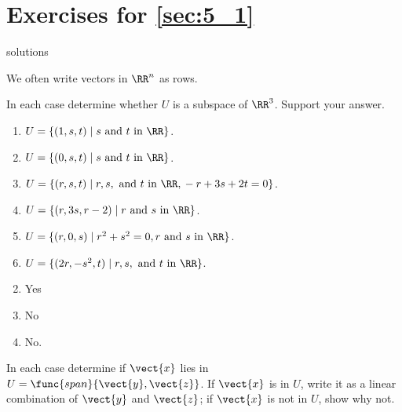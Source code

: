 \section*{Exercises for \ref{sec:5_1}}

\begin{Filesave}{solutions}
\end{Filesave}

\begin{multicols}{2}
{\small \noindent We often write vectors in $\RR^n$ as rows.}

\begin{ex}
In each case determine whether $U$ is a subspace of $\RR^3$. Support your answer.

\begin{enumerate}[label={\alph*.}]
\item $U = \{(1, s, t) \mid s \mbox{ and }t \mbox{ in }\RR\}$.

\item $U = \{(0, s, t) \mid s \mbox{ and } t \mbox{ in } \RR\}$.

\item $U = \{(r, s, t) \mid r, s,\mbox{ and } t \mbox{ in } \RR, \\
 -r + 3s + 2t = 0\}$.

\item $U = \{(r, 3s, r - 2) \mid r \mbox{ and } s \mbox{ in } \RR\}$.

\item $U = \{(r, 0, s) \mid r^{2} + s^{2} = 0, r \mbox{ and } s \mbox{ in } \RR\}$.

\item $U = \{(2r, -s^{2}, t) \mid r,  s, \mbox{ and } t \mbox{ in } \RR\}$.

\end{enumerate}
\begin{sol}
\begin{enumerate}[label={\alph*.}]
\setcounter{enumi}{1}
\item  Yes

\setcounter{enumi}{3}
\item  No

\setcounter{enumi}{5}
\item  No.

\end{enumerate}
\end{sol}
\end{ex}

\begin{ex}
In each case determine if $\vect{x}$ lies in $U = \func{span}\{\vect{y}, \vect{z}\}$. If $\vect{x}$ is in $U$, write it as a linear combination of $\vect{y}$ and $\vect{z}$; if $\vect{x}$ is not in $U$, show why not.


\end{ex}
\end{multicols}
